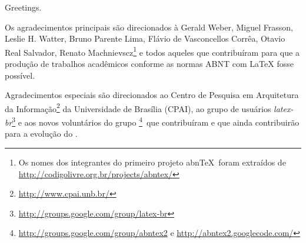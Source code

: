 


\begin{agradecimentos}

    \lang
    {
        Greetings.
    }
    {
        Os agradecimentos principais são direcionados à Gerald Weber, Miguel Frasson,
        Leslie H. Watter, Bruno Parente Lima, Flávio de Vasconcellos Corrêa, Otavio Real
        Salvador, Renato Machnievscz\footnote{Os nomes dos integrantes do primeiro
            projeto abn\TeX\ foram extraídos de
            \url{http://codigolivre.org.br/projects/abntex/}} e todos aqueles que
        contribuíram para que a produção de trabalhos acadêmicos conforme
        as normas ABNT com \LaTeX{} fosse possível.

        Agradecimentos especiais são direcionados ao Centro de Pesquisa em Arquitetura
        da Informação\footnote{\url{http://www.cpai.unb.br/}} da Universidade de
        Brasília (CPAI), ao grupo de usuários
        \emph{latex-br}\footnote{\url{http://groups.google.com/group/latex-br}} e aos
        novos voluntários do grupo
        \emph{\abnTeX{}}\footnote{\url{http://groups.google.com/group/abntex2} e
            \url{http://abntex2.googlecode.com/}}~que contribuíram e que ainda
        contribuirão para a evolução do \abnTeX{}.
    }

\end{agradecimentos}


%
%
%
